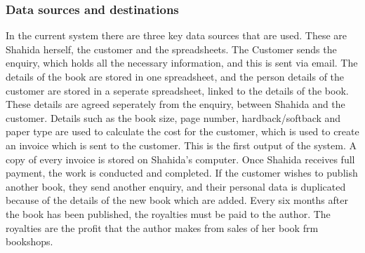 \subsubsection{Data sources and destinations}
In the current system there are three key data sources that are used. These are Shahida herself, the customer and the spreadsheets. The Customer sends the enquiry, which holds all the necessary information, and this is sent via email. The details of the book are stored in one spreadsheet, and the person details of the customer are stored in a seperate spreadsheet, linked to the details of the book. These details are agreed seperately from the enquiry, between Shahida and the customer. Details such as the book size, page number, hardback/softback and paper type are used to calculate the cost for the customer, which is used to create an invoice which is sent to the customer. This is the first output of the system. A copy of every invoice is stored on Shahida's computer. Once Shahida receives full payment, the work is conducted and completed. If the customer wishes to publish another book, they send another enquiry, and their personal data is duplicated because of the details of the new book which are added. Every six months after the book has been published, the royalties must be paid to the author. The royalties are the profit that the author makes from sales of her book frm bookshops.



